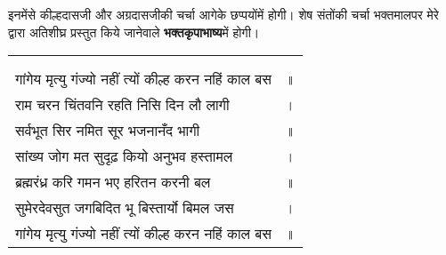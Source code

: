 \begin{sloppypar}\justifying{}
इनमेंसे कील्हदासजी और अग्रदासजीकी चर्चा आगेके छप्पयोंमें होगी। शेष संतोंकी चर्चा भक्तमालपर मेरे द्वारा अतिशीघ्र प्रस्तुत किये जानेवाले \textbf{भक्तकृपाभाष्य}में होगी।
\end{sloppypar}


{
{\bfseries
\setlength{\mylenone}{0pt}
\settowidth{\mylentwo}{}
\setlength{\mylenone}{\maxof{\mylenone}{\mylentwo}}
\settowidth{\mylentwo}{गांगेय मृत्यु गंज्यो नहीं त्यों कील्ह करन नहिं काल बस}
\setlength{\mylenone}{\maxof{\mylenone}{\mylentwo}}
\settowidth{\mylentwo}{राम चरन चिंतवनि रहति निसि दिन लौ लागी}
\setlength{\mylenone}{\maxof{\mylenone}{\mylentwo}}
\settowidth{\mylentwo}{सर्वभूत सिर नमित सूर भजनानँद भागी}
\setlength{\mylenone}{\maxof{\mylenone}{\mylentwo}}
\settowidth{\mylentwo}{सांख्य जोग मत सुदृढ़ कियो अनुभव हस्तामल}
\setlength{\mylenone}{\maxof{\mylenone}{\mylentwo}}
\settowidth{\mylentwo}{ब्रह्मरंध्र करि गमन भए हरितन करनी बल}
\setlength{\mylenone}{\maxof{\mylenone}{\mylentwo}}
\settowidth{\mylentwo}{सुमेरदेवसुत जगबिदित भू बिस्तार्यो बिमल जस}
\setlength{\mylenone}{\maxof{\mylenone}{\mylentwo}}
\settowidth{\mylentwo}{गांगेय मृत्यु गंज्यो नहीं त्यों कील्ह करन नहिं काल बस}
\setlength{\mylenone}{\maxof{\mylenone}{\mylentwo}}
\setlength{\mylentwo}{\baselineskip}
\setlength{\mylenone}{\mylenone + 1pt}
\begin{longtable}[l]{@{\hspace*{\mylen}}>{\setlength\parfillskip{0pt}}p{\mylenone}@{}@{}l@{}}
 & \\[-\the\mylentwo]
\centering{॥ ४० \hspace*{-1.5mm}॥} & \\ \nopagebreak
गांगेय मृत्यु गंज्यो नहीं त्यों कील्ह करन नहिं काल बस & ॥\\
राम चरन चिंतवनि रहति निसि दिन लौ लागी & ।\\ \nopagebreak
सर्वभूत सिर नमित सूर भजनानँद भागी & ॥\\
सांख्य जोग मत सुदृढ़ कियो अनुभव हस्तामल & ।\\ \nopagebreak
ब्रह्मरंध्र करि गमन भए हरितन करनी बल & ॥\\
सुमेरदेवसुत जगबिदित भू बिस्तार्यो बिमल जस & ।\\ \nopagebreak
गांगेय मृत्यु गंज्यो नहीं त्यों कील्ह करन नहिं काल बस & ॥
\end{longtable}
}
}
